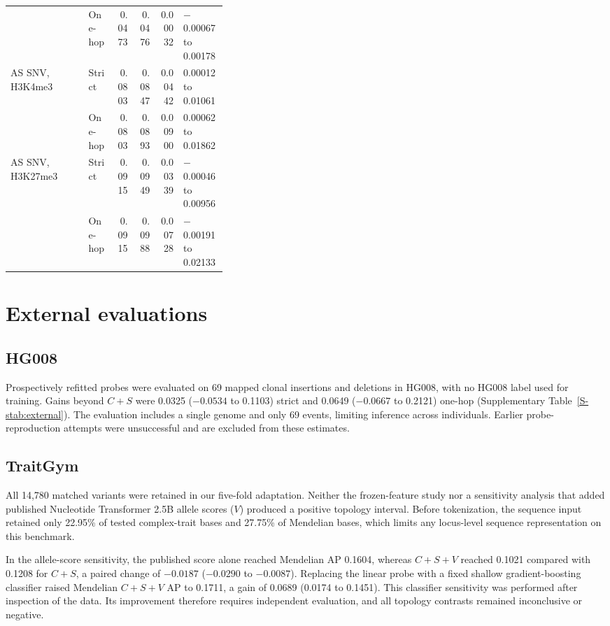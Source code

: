\documentclass[11pt]{article}
\begin{document}
\begin{bibunit}[unsrtnat]
\begin{table}[H]
\begin{tabular}{@{}p{0.36\linewidth}lrrrl@{}}
 & One-hop & 0.0473 & 0.0476 & 0.00032 & $-$0.00067 to 0.00178 \\
AS SNV, H3K4me3 & Strict & 0.0803 & 0.0847 & 0.00442 & 0.00012 to 0.01061 \\
 & One-hop & 0.0803 & 0.0893 & 0.00900 & 0.00062 to 0.01862 \\
AS SNV, H3K27me3 & Strict & 0.0915 & 0.0949 & 0.00339 & $-$0.00046 to 0.00956 \\
 & One-hop & 0.0915 & 0.0988 & 0.00728 & $-$0.00191 to 0.02133 \\
\bottomrule
\end{tabular}
\end{table}

\section{External evaluations}
\label{S-snote:external}

\subsection{HG008}
Prospectively refitted probes were evaluated on 69 mapped clonal insertions and deletions in HG008, with no HG008 label used for training. Gains beyond $C+S$ were 0.0325 ($-0.0534$ to 0.1103) strict and 0.0649 ($-0.0667$ to 0.2121) one-hop (Supplementary Table~\ref{S-stab:external}). The evaluation includes a single genome and only 69 events, limiting inference across individuals. Earlier probe-reproduction attempts were unsuccessful and are excluded from these estimates.

\subsection{TraitGym}
All 14,780 matched variants\cite{supp__benegas2025traitgym} were retained in our five-fold adaptation. Neither the frozen-feature study nor a sensitivity analysis that added published Nucleotide Transformer 2.5B allele scores ($V$) produced a positive topology interval. Before tokenization, the sequence input retained only 22.95\% of tested complex-trait bases and 27.75\% of Mendelian bases, which limits any locus-level sequence representation on this benchmark.

In the allele-score sensitivity, the published score alone reached Mendelian AP 0.1604, whereas $C+S+V$ reached 0.1021 compared with 0.1208 for $C+S$, a paired change of $-0.0187$ ($-0.0290$ to $-0.0087$). Replacing the linear probe with a fixed shallow gradient-boosting classifier raised Mendelian $C+S+V$ AP to 0.1711, a gain of 0.0689 (0.0174 to 0.1451). This classifier sensitivity was performed after inspection of the data. Its improvement therefore requires independent evaluation, and all topology contrasts remained inconclusive or negative.


\end{bibunit}
\end{document}
